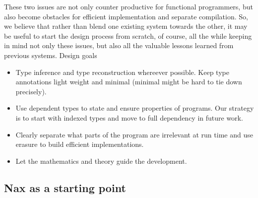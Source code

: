 These two issues are not only counter productive for functional programmers, but also
become obstacles for efficient  implementation and separate
compilation. So, we believe that rather than blend one existing system
towards the other, it may be useful to start the design process from scratch,
of course, all the while keeping in mind not only these issues, but also
all the valuable lessons learned from previous systems. Design goals
\begin{itemize}
\item Type inference and type reconstruction whereever possible. Keep type
annotations light weight and minimal (minimal might be hard to tie down precisely).

\item Use dependent types to state and ensure properties of programs. Our strategy
is to start with indexed types and move to full dependency in future work.

\item Clearly separate what parts of the program are irrelevant at run time and
use erasure to build efficient implementations.

\item Let the mathematics and theory guide the development.
\end{itemize}

 

\subsection{Nax as a starting point}
 
